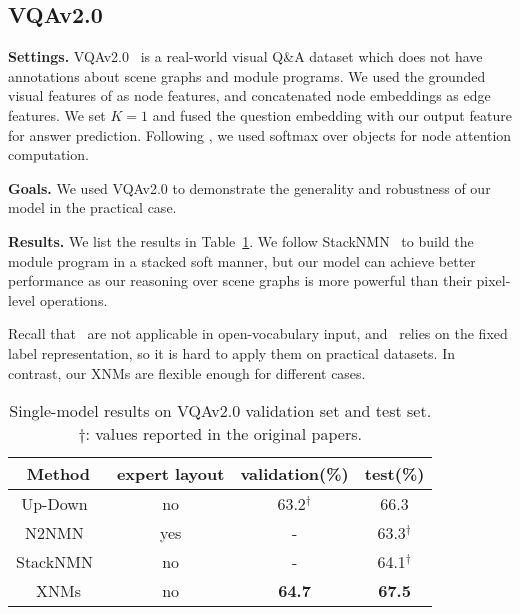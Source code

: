 \documentclass[10pt,twocolumn,letterpaper]{article}
\begin{document}
\subsection{VQAv2.0}
\textbf{Settings.}
VQAv2.0~\cite{goyal2017vqa2} is a real-world visual Q\&A dataset which does not have annotations about scene graphs and module programs.
We used the grounded visual features of \cite{anderson2018bottom} as node features, and concatenated node embeddings as edge features.
We set $K=1$ and fused the question embedding with our output feature for answer prediction.
Following \cite{anderson2018bottom}, we used softmax over objects for node attention computation.


\textbf{Goals.}
We used VQAv2.0 to demonstrate the generality and robustness of our model in the practical case.

\textbf{Results.}
We list the results in Table~\ref{tab:vqa-results}.
We follow StackNMN~\cite{hu2018explainable} to build the module program in a stacked soft manner, but our model can achieve better performance as our reasoning over scene graphs is more powerful than their pixel-level operations.

Recall that~\cite{johnson2017inferring,mascharka2018transparency} are not applicable in open-vocabulary input, and~\cite{yi2018nsvqa} relies on the fixed label representation, so it is hard to apply them on practical datasets.
In contrast, our XNMs are flexible enough for different cases.

\begin{table}[h]
    \caption{Single-model results on VQAv2.0 validation set and test set. $\dagger$: values reported in the original papers.}
    \centering
    \footnotesize
    \begin{tabular}{|c|c|c|c|}
    \hline
    Method                          &    expert layout   &   validation(\%)   &   test(\%)  \\
    \hline
    Up-Down~\cite{anderson2018bottom}   &   no   &   63.2$^\dagger$   &  66.3 \\
    N2NMN~\cite{hu2017learning}    &    yes      &     -    &  63.3$^\dagger$   \\
    StackNMN~\cite{hu2018explainable}  &    no   &     -    &  64.1$^\dagger$  \\
    XNMs     &     no     &  \textbf{64.7}   &   \textbf{67.5}    \\
    \hline
    \end{tabular}
    \label{tab:vqa-results}
\vspace{-0.4cm}
\end{table}
\end{document}
